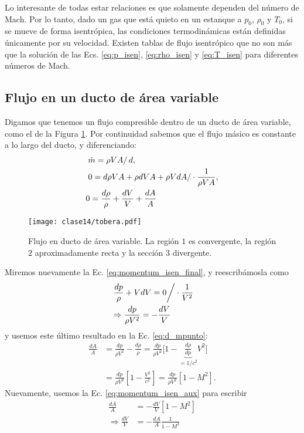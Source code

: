 Lo interesante de todas estar relaciones es que solamente dependen del número de Mach. 
Por lo tanto, dado un gas que está quieto en un estanque a $p_0$, $\rho_0$ y $T_0$, si se mueve de forma isentrópica, las condiciones termodinámicas están definidas únicamente por su velocidad.
Existen tablas de flujo isentrópico que no son más que la solución de las Ecs. \eqref{eq:p_isen}, \eqref{eq:rho_isen} y \eqref{eq:T_isen} para diferentes números de Mach.

\subsection*{Flujo en un ducto de área variable}

Digamos que tenemos un flujo compresible dentro de un ducto de área variable, como el de la Figura \ref{fig:tobera}. 
Por continuidad sabemos que el flujo másico es constante a lo largo del ducto, y diferenciando:
%
\begin{align}\label{eq:d_mpunto}
&\left.\dot{m}=\rho V A\right/ d,\nonumber\\
&\left.0 = d\rho VA + \rho dV A + \rho V dA\right/\cdot\frac{1}{\rho VA}, \nonumber\\
&0 = \frac{d\rho}{\rho} + \frac{dV}{V} + \frac{dA}{A}  
\end{align}

\begin{figure}
\centering
\texttt{[image: clase14/tobera.pdf]}
\caption{Flujo en ducto de área variable. La región $1$ es convergente, la región $2$ aproximadamente recta y la sección $3$ divergente.}
\label{fig:tobera}
\end{figure}

Miremos nuevamente la Ec. \eqref{eq:momentum_isen_final}, y reescribámosla como
%
\begin{align}\label{eq:momentum_isen_aux}
&\left.\frac{dp}{\rho} + VdV = 0\right/\cdot\frac{1}{V^2}\nonumber\\
&\Rightarrow\frac{dp}{\rho V^2} = -\frac{dV}{V}
\end{align}
%
y usemos este último resultado en la Ec. \eqref{eq:d_mpunto}:
%
\begin{align}
\frac{dA}{A} &= \frac{dp}{\rho V^2} - \frac{d\rho}{\rho} = \frac{dp}{\rho V^2} \Big[1-\underbrace{\frac{d\rho}{dp}}_{=1/c^2} V^2\Big]\nonumber\\
&=\frac{dp}{\rho V^2} \left[ 1-\frac{V^2}{c^2}\right] = \frac{dp}{\rho V^2}\left[1-M^2\right].
\end{align}
%
Nuevamente, usemos la Ec. \eqref{eq:momentum_isen_aux} para escribir
%
\begin{align}\label{eq:tobera}
\frac{dA}{A} &= -\frac{dV}{V}\left[1-M^2\right]\nonumber\\
\Rightarrow \frac{dV}{V}&=-\frac{dA}{A}\frac{1}{1-M^2}
\end{align}

